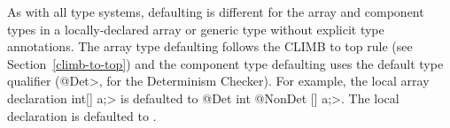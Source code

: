 As with all type systems, defaulting is different for the array and
component types in a locally-declared array or generic type without explicit type
annotations.
The array type defaulting follows the CLIMB to top rule (see Section~\ref{climb-to-top}) and
the component type defaulting uses the default type qualifier (\<@Det>, for
the Determinism Checker).
For example, the local array declaration \<int[] a;> is defaulted to \<@Det int @NonDet [] a;>.
The local declaration  is defaulted to
.



